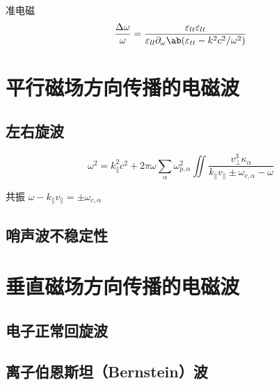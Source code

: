 准电磁
\begin{equation}
\frac{\Delta\omega}{\omega}
=\frac{\varepsilon_{lt} \varepsilon_{lt}}
{\varepsilon_{ll} \pdv{\ab(\varepsilon_{tt} - k^2 c^2 / \omega^2)}!{\omega}}
\end{equation}

\section{平行磁场方向传播的电磁波}

\subsection{左右旋波}

\begin{equation}
\omega^2 = k_\parallel^2 c^2 + 2 \pi \omega \sum_\alpha \omega_{p,\alpha}^2
\iint \frac{v_\perp^3 \kappa_\alpha}{k_\parallel v_\parallel \pm \omega_{c,\alpha} - \omega}
\end{equation}

共振 $\omega - k_\parallel v_\parallel = \pm \omega_{c,\alpha}$

\subsection{哨声波不稳定性}

\section{垂直磁场方向传播的电磁波}

\subsection{电子正常回旋波}

\subsection{离子伯恩斯坦（Bernstein）波}
